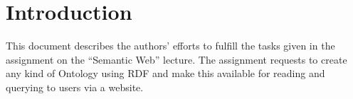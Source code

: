 \section{Introduction}
This document describes the authors' efforts to fulfill the tasks given in the assignment on the ``Semantic Web'' lecture. The assignment requests to create any kind of Ontology using RDF and make this available for reading and querying to users via a website\cite{FusekiManual}.